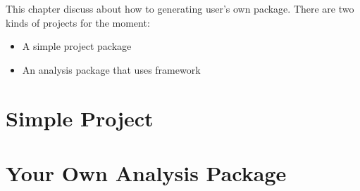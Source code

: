 
This chapter discuss about how to generating user's own package. 
There are two kinds of projects for the moment:
\begin{itemize}
\item A simple \CPP project package 
\item An analysis package that uses \Analysis framework
\end{itemize}

\section{Simple \CPP Project}
\label{sec:simplecpp}


\section{Your Own Analysis Package}
\label{sec:yourana}

